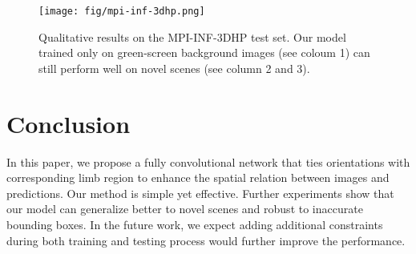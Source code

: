 \documentclass{bmvc2k}
\begin{document}
\begin{figure*}
	\begin{center}
		\texttt{[image: fig/mpi-inf-3dhp.png]}
	\end{center}
	\caption{Qualitative results on the MPI-INF-3DHP test set. Our model trained only on green-screen background images (see coloum 1) can still perform well on novel scenes (see column 2 and 3).}
	\label{fig:mpi-inf-3dhp}
\end{figure*}
    
\section{Conclusion}
In this paper, we propose a fully convolutional network that ties orientations with corresponding limb region to enhance the spatial relation between images and predictions. Our method is simple yet effective. Further experiments show that our model can generalize better to novel scenes and robust to inaccurate bounding boxes. In the future work, we expect adding additional constraints during both training and testing process would further improve the performance.

\newpage

\end{document}
